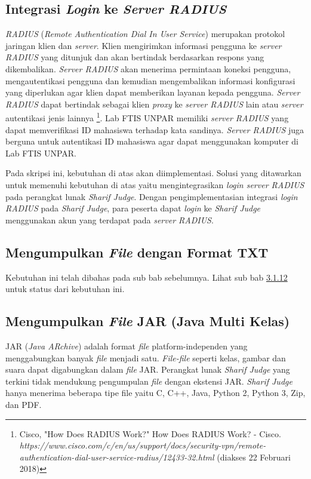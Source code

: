 \subsection{Integrasi \textit{Login} ke \textit{Server RADIUS}}
\textit{RADIUS} (\textit{Remote Authentication Dial In User Service}) merupakan protokol jaringan klien dan \textit{server}. Klien mengirimkan informasi pengguna ke \textit{server RADIUS} yang ditunjuk dan akan bertindak berdasarkan respons yang dikembalikan. \textit{Server RADIUS} akan menerima permintaan koneksi pengguna, mengautentikasi pengguna dan kemudian mengembalikan informasi konfigurasi yang diperlukan agar klien dapat memberikan layanan kepada pengguna. \textit{Server RADIUS} dapat bertindak sebagai klien \textit{proxy} ke \textit{server RADIUS} lain atau \textit{server} autentikasi jenis lainnya \footnote{Cisco, "How Does RADIUS Work?" How Does RADIUS Work? - Cisco. \textit{https://www.cisco.com/c/en/us/support/docs/security-vpn/remote-authentication-dial-user-service-radius/12433-32.html} (diakses 22 Februari 2018)}. %
Lab FTIS UNPAR memiliki \textit{server RADIUS} yang dapat memverifikasi ID mahasiswa terhadap kata sandinya. \textit{Server RADIUS} juga berguna untuk autentikasi ID mahasiswa agar dapat menggunakan komputer di Lab FTIS UNPAR.

Pada skripsi ini, kebutuhan di atas akan diimplementasi. Solusi yang ditawarkan untuk memenuhi kebutuhan di atas yaitu mengintegrasikan \textit{login server RADIUS} pada perangkat lunak \textit{Sharif Judge}. Dengan pengimplementasian integrasi \textit{login RADIUS} pada \textit{Sharif Judge}, para peserta dapat \textit{login} ke \textit{Sharif Judge} menggunakan akun yang terdapat pada \textit{server RADIUS}. 

\subsection{Mengumpulkan \textit{File} dengan Format TXT}
Kebutuhan ini telah dibahas pada sub bab sebelumnya. Lihat sub bab \hyperref[subsec:filetxt]{3.1.12} untuk status dari kebutuhan ini.

\subsection{Mengumpulkan \textit{File} JAR (Java Multi Kelas)}
JAR (\textit{Java ARchive}) adalah format \textit{file} platform-independen yang menggabungkan banyak \textit{file} menjadi satu. \textit{File-file} seperti kelas, gambar dan suara dapat digabungkan dalam \textit{file} JAR. Perangkat lunak \textit{Sharif Judge} yang terkini tidak mendukung pengumpulan \textit{file} dengan ekstensi JAR. \textit{Sharif Judge} hanya menerima beberapa tipe file yaitu C, C++, Java, Python 2, Python 3, Zip, dan PDF.

